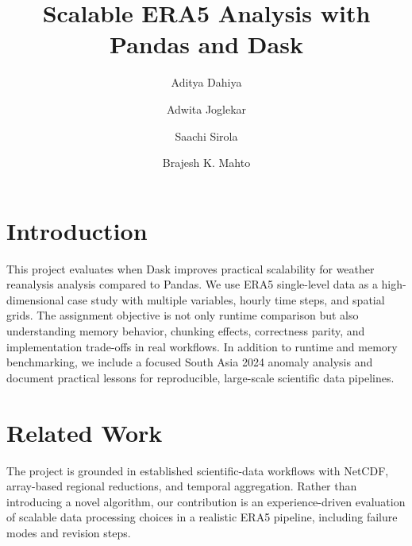 
\usepackage{lmodern}


\title{Scalable ERA5 Analysis with Pandas and Dask}

\author{
    \small Aditya Dahiya \and
    \small Adwita Joglekar \and
    \small Saachi Sirola \and
    \small Brajesh K. Mahto
    }





\maketitle


\section{Introduction}
This project evaluates when Dask improves practical scalability for weather
reanalysis analysis compared to Pandas. We use ERA5 single-level data as a
high-dimensional case study with multiple variables, hourly time steps, and
spatial grids. The assignment objective is not only runtime comparison but also
understanding memory behavior, chunking effects, correctness parity, and
implementation trade-offs in real workflows.
In addition to runtime and memory benchmarking, we include a focused South Asia
2024 anomaly analysis and document practical lessons for reproducible,
large-scale scientific data pipelines.


\section{Related Work}
The project is grounded in established scientific-data workflows with NetCDF,
array-based regional reductions, and temporal aggregation. Rather than
introducing a novel algorithm, our contribution is an experience-driven
evaluation of scalable data processing choices in a realistic ERA5 pipeline,
including failure modes and revision steps.

